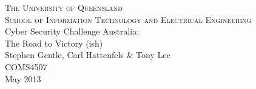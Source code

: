 \documentclass[11pt,a4paper,oneside]{book}
\begin{document}
\frontmatter

\begin{titlepage}
\begin{center}

\textsc{\LARGE The University of Queensland}\\[0.4cm]

\textsc{\Large School of Information Technology and Electrical Engineering}\\[2cm]

{\huge Cyber Security Challenge Australia:\\The Road to Victory (ish)}\\[1.8cm]

{\Large Stephen Gentle, Carl Hattenfels \& Tony Lee}\\[1.5cm]
{\large COMS4507}\\[0.5cm]
{\large May 2013}\\[5.4cm]

\end{center}

\end{titlepage}

\cleardoublepage



\tableofcontents
\listoffigures
\listoftables

\mainmatter











\clearpage
%
\end{document}
